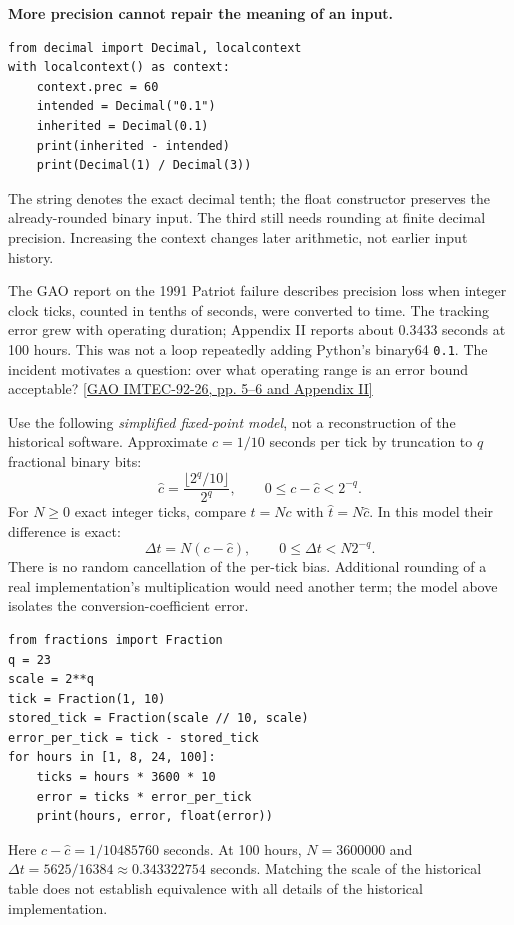 \textbf{More precision cannot repair the meaning of an input.}
\begin{lstlisting}
from decimal import Decimal, localcontext
with localcontext() as context:
    context.prec = 60
    intended = Decimal("0.1")
    inherited = Decimal(0.1)
    print(inherited - intended)
    print(Decimal(1) / Decimal(3))
\end{lstlisting}
The string denotes the exact decimal tenth; the float constructor preserves the
already-rounded binary input. The third still needs rounding at finite decimal
precision. Increasing the context changes later arithmetic, not earlier input history.

\newpage
{}
The GAO report on the 1991 Patriot failure describes precision loss when integer
clock ticks, counted in tenths of seconds, were converted to time. The tracking
error grew with operating duration; Appendix II reports about $0.3433$ seconds
at 100 hours. This was not a loop repeatedly adding Python's binary64 \texttt{0.1}.
The incident motivates a question: over what operating range is an error bound acceptable?
\href{https://www.gao.gov/assets/imtec-92-26.pdf}{[GAO IMTEC-92-26, pp. 5--6 and Appendix II]}

Use the following \emph{simplified fixed-point model}, not a reconstruction of the
historical software. Approximate $c=1/10$ seconds per tick by truncation to $q$
fractional binary bits:
\[
 \widehat c=\frac{\lfloor 2^q/10\rfloor}{2^q},\qquad
 0\le c-\widehat c<2^{-q}.
\]
For $N\ge0$ exact integer ticks, compare $t=Nc$ with $\widehat t=N\widehat c$.
In this model their difference is exact:
\[
 \Delta t=N(c-\widehat c),\qquad 0\le\Delta t<N2^{-q}.
\]
There is no random cancellation of the per-tick bias. Additional rounding of a
real implementation's multiplication would need another term; the model above
isolates the conversion-coefficient error.
\begin{lstlisting}
from fractions import Fraction
q = 23
scale = 2**q
tick = Fraction(1, 10)
stored_tick = Fraction(scale // 10, scale)
error_per_tick = tick - stored_tick
for hours in [1, 8, 24, 100]:
    ticks = hours * 3600 * 10
    error = ticks * error_per_tick
    print(hours, error, float(error))
\end{lstlisting}
Here $c-\widehat c=1/10485760$ seconds. At 100 hours,
$N=3600000$ and $\Delta t=5625/16384\approx0.343322754$ seconds.
Matching the scale of the historical table does not establish equivalence with
all details of the historical implementation.

